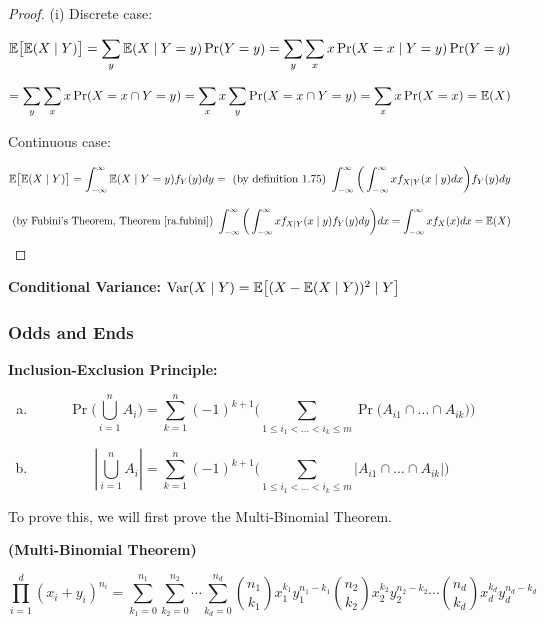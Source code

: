 \begin{proof}(i) Discrete case:

\[
\E\big[ \E(X \mid Y) \big] = \sum_{y} \E(X \mid Y = y) \Pr(Y=y) =  \sum_{y} \sum_{x} x \Pr(X=x \mid Y=y) \Pr(Y=y) 
\]

\[
=  \sum_{y} \sum_{x} x \Pr(X=x \cap Y=y) =  \sum_{x}x \sum_{y}  \Pr(X=x \cap Y=y) = \sum_x x \Pr(X=x) = \E(X)
\]

Continuous case:

\[
\E\big[ \E(X \mid Y) \big]  = \int_{-\infty}^\infty \E(X \mid Y = y) f_Y(y) dy = \text{ (by definition 1.75) }  \int_{-\infty}^\infty \bigg( \int_{-\infty}^\infty x f_{X\mid Y}(x \mid y) dx \bigg)  f_Y(y) dy
\]

\[
\text{ (by Fubini's Theorem, Theorem \ref{ra.fubini}) }  \int_{-\infty}^\infty \bigg( \int_{-\infty}^\infty x f_{X\mid Y}(x \mid y)  f_Y(y) dy \bigg)  dx = \int_{-\infty}^\infty x f_X(x) dx = \E(X)
\]

\end{proof}

\begin{definition} \textbf{Conditional Variance:} \(\Var(X \mid Y) = \E\big[ (X - \E(X \mid Y))^2   \mid Y\big]\)
\end{definition}

\subsubsection{Odds and Ends}

\begin{proposition} \label{prob.inex} \textbf{Inclusion-Exclusion Principle:}
\begin{enumerate}[(a)]

\item \[
\Pr \bigg( \bigcup_{i=1}^n A_i \bigg) = \sum_{k=1}^n (-1)^{k+1} \bigg( \sum_{1 \leq i_1 < \ldots < i_k \leq m} \Pr \big(A_{i1} \cap \ldots \cap A_{ik} \big) \bigg)
\]

\item \[
\left| \bigcup_{i=1}^n A_i \right| = \sum_{k=1}^n (-1)^{k+1} \bigg( \sum_{1 \leq i_1 < \ldots < i_k \leq m} \left| A_{i1} \cap \ldots \cap A_{ik} \right| \bigg)
\]
\end{enumerate}

\end{proposition}

To prove this, we will first prove the Multi-Binomial Theorem.

\begin{lemma}\label{prob.m.bin.thm}\textbf{(Multi-Binomial Theorem)} 

\[
\prod_{i=1}^d (x_i + y_i)^{n_i} = \sum_{k_1=0}^{n_1} \sum_{k_2=0}^{n_2} \cdots \sum_{k_d=0}^{n_d} \binom{n_1}{k_1}x_1^{k_1}y_1^{n_1-k_1} \binom{n_2}{k_2}x_2^{k_2}y_2^{n_2-k_2} \cdots \binom{n_d}{k_d}x_d^{k_d}y_d^{n_d-k_d}
\]

\end{lemma}

